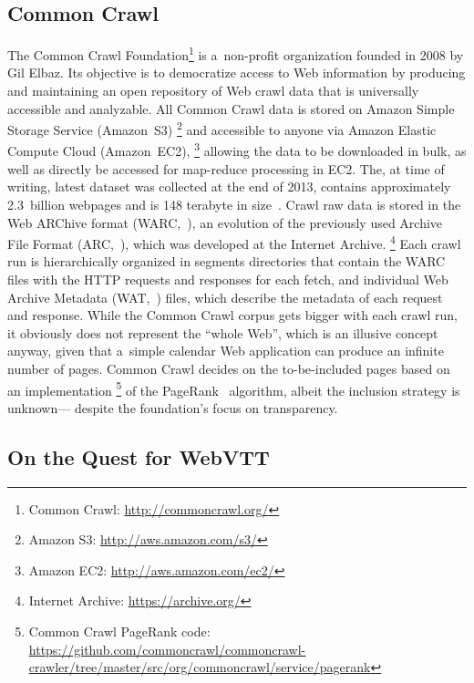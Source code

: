 \documentclass{sig-alternate-ceur}
\newcommand{\inlinelistingsize}{\fontsize{8pt}{11pt}}
\let\oldurl\url
\renewcommand{\url}[1]{\inlinelistingsize\oldurl{#1}}
\begin{document}
\subsection{Common Crawl}

The Common Crawl Foundation\footnote{Common Crawl: \url{http://commoncrawl.org/}}
is a~non-profit organization founded in 2008 by Gil Elbaz.
Its objective is to democratize access to Web information
by producing and maintaining an open repository of Web crawl data
that is universally accessible and analyzable.
All Common Crawl data is stored on Amazon Simple Storage Service (Amazon~S3)%
\footnote{Amazon S3: \url{http://aws.amazon.com/s3/}} and
accessible to anyone via Amazon Elastic Compute Cloud (Amazon~EC2),%
\footnote{Amazon EC2: \url{http://aws.amazon.com/ec2/}}
allowing the data to be downloaded in bulk,
as well as directly be accessed for map-reduce processing in EC2.
The, at time of writing, latest dataset was collected at the end of 2013,
contains approximately 2.3~billion webpages
and is 148 terabyte in size~\cite{green2014winter}.
Crawl raw data is stored in the Web ARChive format
(WARC,~\cite{iso285002008warc}), an evolution of the previously used
Archive File Format (ARC,~\cite{burner1996arc}),
which was developed at the Internet Archive.%
\footnote{Internet Archive: \url{https://archive.org/}}
Each crawl run is hierarchically organized in segments directories
that contain the WARC files with the HTTP requests and responses for each fetch,
and individual Web Archive Metadata (WAT,~\cite{goel2011wat}) files,
which describe the metadata of each request and response.
While the Common Crawl corpus gets bigger with each crawl run,
it obviously does not represent the ``whole Web'',
which is an illusive concept anyway,
given that a~simple calendar Web application can produce an infinite number of pages.
Common Crawl decides on the to-be-included pages based on an implementation%
\footnote{Common Crawl PageRank code:
\url{https://github.com/commoncrawl/commoncrawl-crawler/tree/master/src/org/commoncrawl/service/pagerank}}
of the PageRank~\cite{page1999pagerank} algorithm,
albeit the inclusion strategy is unknown---%
despite the foundation's focus on transparency.

\subsection{On the Quest for WebVTT}
\end{document}

